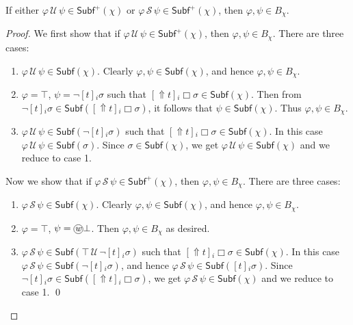 \documentclass[envcountsect,envcountsame,oribibl,orivec]{llncs}
\newcommand*\circled[1]{\tikz[baseline=(char.base)]{
		\node[shape=circle,draw,inner sep=0.4pt] (char) {#1};}}
\newcommand{\lalways}{\Box}
\newcommand{\luntil}{{\,\mathcal{U}\,}}
\newcommand{\lsince}{{\,\mathcal{S}\,}}
\newcommand{\wprevious}{\circled{\textit{w}}}
\newcommand{\jbox}[1]{\left[#1\right]\!}
\newcommand{\tgeneralize}{\Uparrow}
\renewcommand{\phi}{\varphi}
\newcommand{\Subf}{\mathsf{Subf}}
\begin{document}
\begin{lemma}\label{lem:until-since-Subf}
    If either $\phi \luntil \psi \in \Subf^+(\chi)$ or $\phi \lsince \psi \in \Subf^+(\chi)$, then $\phi, \psi \in B_\chi$.
\end{lemma}
\begin{proof}
	We first show that if $\phi \luntil \psi \in \Subf^+(\chi)$, then $\phi, \psi \in B_\chi$. There are three cases:
	
	\begin{enumerate}
		\item $\phi \luntil \psi \in \Subf(\chi)$. Clearly $\phi, \psi \in \Subf(\chi)$, and hence $\phi, \psi \in B_\chi$.
		
		\item $\phi = \top$, $\psi = \neg \jbox{t}_i \sigma$ such that $\jbox{\tgeneralize t}_i \lalways \sigma \in \Subf(\chi)$. Then from $\neg \jbox{t}_i \sigma \in \Subf(\jbox{\tgeneralize t}_i \lalways \sigma)$, it follows that $\psi \in \Subf(\chi)$. Thus $\phi, \psi \in B_\chi$.
		
		\item $\phi \luntil \psi \in \Subf(\neg \jbox{t}_i \sigma)$ such that $\jbox{\tgeneralize t}_i \lalways \sigma \in \Subf(\chi)$. In this case $\phi \luntil \psi \in \Subf(\sigma)$. Since  $\sigma \in \Subf(\chi)$, we get $\phi \luntil \psi \in \Subf(\chi)$ and we reduce to case 1.
	\end{enumerate}

Now we show that if $\phi \lsince \psi \in \Subf^+(\chi)$, then $\phi, \psi \in B_\chi$. There are three cases:

\begin{enumerate}
	\item $\phi \lsince \psi \in \Subf(\chi)$. Clearly $\phi, \psi \in \Subf(\chi)$, and hence $\phi, \psi \in B_\chi$.
	
	\item $\phi = \top$, $\psi = \wprevious \bot$. Then $\phi, \psi \in B_\chi$ as desired.
	
	\item $\phi \lsince \psi \in \Subf(\top \luntil \neg \jbox{t}_i \sigma)$ such that $\jbox{\tgeneralize t}_i \lalways \sigma \in \Subf(\chi)$. In this case $\phi \lsince \psi \in \Subf(\neg \jbox{t}_i \sigma)$, and hence $\phi \lsince \psi \in \Subf(\jbox{t}_i \sigma)$. Since $\neg \jbox{t}_i \sigma \in \Subf(\jbox{\tgeneralize t}_i \lalways \sigma)$,  we get $\phi \lsince \psi \in \Subf(\chi)$ and we reduce to case 1. \qed
\end{enumerate}
\end{proof}
\end{document}
